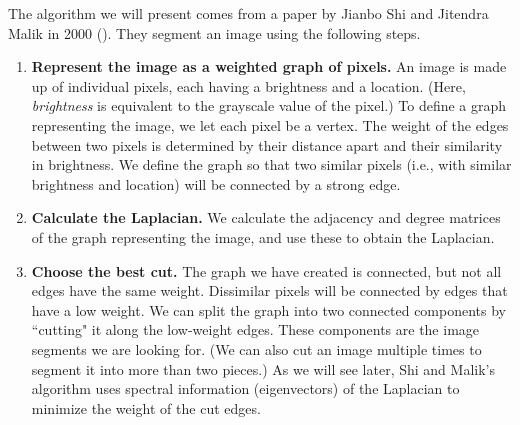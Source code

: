 The algorithm we will present comes from a paper by Jianbo Shi and Jitendra Malik in 2000 (\cite{Shi2000}).
They segment an image using the following steps.
\begin{enumerate}
	\item \textbf{Represent the image as a weighted graph of pixels.}
An image is made up of individual pixels, each having a brightness and a location.
(Here, \emph{brightness} is equivalent to the grayscale value of the pixel.)
To define a graph representing the image, we let each pixel be a vertex.
The weight of the edges between two pixels is determined by their distance apart and their similarity in brightness.
We define the graph so that two similar pixels (i.e., with similar brightness and location) will be connected by a strong edge.
	\item \textbf{Calculate the Laplacian.}
We calculate the adjacency and degree matrices of the graph representing the image, and use these to obtain the Laplacian.
	\item \textbf{Choose the best cut.}
The graph we have created is connected, but not all edges have the same weight.
Dissimilar pixels will be connected by edges that have a low weight.
We can split the graph into two connected components by ``cutting" it along the low-weight edges.
These components are the image segments we are looking for.
(We can also cut an image multiple times to segment it into more than two pieces.)
As we will see later, Shi and Malik's algorithm uses spectral information (eigenvectors) of the Laplacian to minimize the weight of the cut edges.
\end{enumerate}

